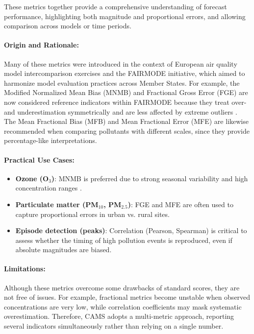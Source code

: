 These metrics together provide a comprehensive understanding of forecast performance, highlighting both magnitude and proportional errors, and allowing comparison across models or time periods.



\paragraph{Origin and Rationale:}
Many of these metrics were introduced in the context of European air quality model intercomparison exercises and the FAIRMODE initiative, which aimed to harmonize model evaluation practices across Member States. For example, the Modified Normalized Mean Bias (MNMB) and Fractional Gross Error (FGE) are now considered reference indicators within FAIRMODE because they treat over- and underestimation symmetrically and are less affected by extreme outliers \cite{CAMSreport}. The Mean Fractional Bias (MFB) and Mean Fractional Error (MFE) are likewise recommended when comparing pollutants with different scales, since they provide percentage-like interpretations.

\paragraph{Practical Use Cases:}
\begin{itemize}
	\item \textbf{Ozone (O$_3$)}: MNMB is preferred due to strong seasonal variability and high concentration ranges \cite{de2025new}.
	\item \textbf{Particulate matter (PM$_{10}$, PM$_{2.5}$)}: FGE and MFE are often used to capture proportional errors in urban vs. rural sites\cite{de2025new}.
	\item \textbf{Episode detection (peaks)}: Correlation (Pearson, Spearman) is critical to assess whether the timing of high pollution events is reproduced, even if absolute magnitudes are biased\cite{de2025new}.
\end{itemize}

\paragraph{Limitations:}
Although these metrics overcome some drawbacks of standard scores, they are not free of issues. For example, fractional metrics become unstable when observed concentrations are very low, while correlation coefficients may mask systematic overestimation. Therefore, CAMS adopts a multi-metric approach, reporting several indicators simultaneously rather than relying on a single number.


